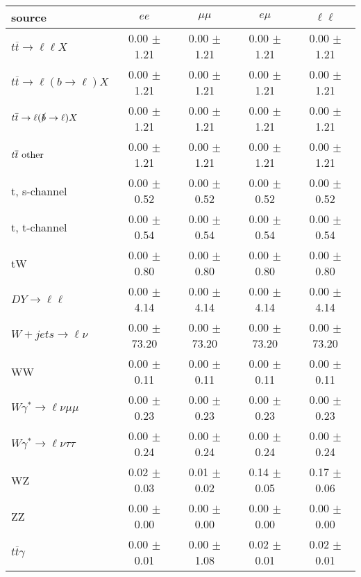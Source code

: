 \begin{tabular}{l|cccc} \hline\hline
source & $ee$ & $\mu\mu$ & $e\mu$ & $\ell\ell $ \\
\hline
$t\overline{t} \rightarrow \ell \ell X$ &  0.00 $\pm$  1.21 &  0.00 $\pm$  1.21 &  0.00 $\pm$  1.21 &  0.00 $\pm$  1.21 \\
$t\overline{t} \rightarrow \ell (b \rightarrow \ell) X$ &  0.00 $\pm$  1.21 &  0.00 $\pm$  1.21 &  0.00 $\pm$  1.21 &  0.00 $\pm$  1.21 \\
$t\overline{t} \rightarrow \ell (\slashed b \rightarrow \ell) X$ &  0.00 $\pm$  1.21 &  0.00 $\pm$  1.21 &  0.00 $\pm$  1.21 &  0.00 $\pm$  1.21 \\
        $t\overline{t}\ \rm{other}$ &  0.00 $\pm$  1.21 &  0.00 $\pm$  1.21 &  0.00 $\pm$  1.21 &  0.00 $\pm$  1.21 \\
\hline
                       t, s-channel &  0.00 $\pm$  0.52 &  0.00 $\pm$  0.52 &  0.00 $\pm$  0.52 &  0.00 $\pm$  0.52 \\
                       t, t-channel &  0.00 $\pm$  0.54 &  0.00 $\pm$  0.54 &  0.00 $\pm$  0.54 &  0.00 $\pm$  0.54 \\
                                 tW &  0.00 $\pm$  0.80 &  0.00 $\pm$  0.80 &  0.00 $\pm$  0.80 &  0.00 $\pm$  0.80 \\
\hline
         $DY \rightarrow \ell \ell$ &  0.00 $\pm$  4.14 &  0.00 $\pm$  4.14 &  0.00 $\pm$  4.14 &  0.00 $\pm$  4.14 \\
      $W+jets \rightarrow \ell \nu$ &  0.00 $\pm$ 73.20 &  0.00 $\pm$ 73.20 &  0.00 $\pm$ 73.20 &  0.00 $\pm$ 73.20 \\
                                 WW &  0.00 $\pm$  0.11 &  0.00 $\pm$  0.11 &  0.00 $\pm$  0.11 &  0.00 $\pm$  0.11 \\
\hline
$W\gamma^{*} \rightarrow \ell \nu \mu\mu$ &  0.00 $\pm$  0.23 &  0.00 $\pm$  0.23 &  0.00 $\pm$  0.23 &  0.00 $\pm$  0.23 \\
$W\gamma^{*} \rightarrow \ell \nu \tau\tau$ &  0.00 $\pm$  0.24 &  0.00 $\pm$  0.24 &  0.00 $\pm$  0.24 &  0.00 $\pm$  0.24 \\
                                 WZ &  0.02 $\pm$  0.03 &  0.01 $\pm$  0.02 &  0.14 $\pm$  0.05 &  0.17 $\pm$  0.06 \\
                                 ZZ &  0.00 $\pm$  0.00 &  0.00 $\pm$  0.00 &  0.00 $\pm$  0.00 &  0.00 $\pm$  0.00 \\
\hline
              $t\overline{t}\gamma$ &  0.00 $\pm$  0.01 &  0.00 $\pm$  1.08 &  0.02 $\pm$  0.01 &  0.02 $\pm$  0.01 \\

\end{tabular}

